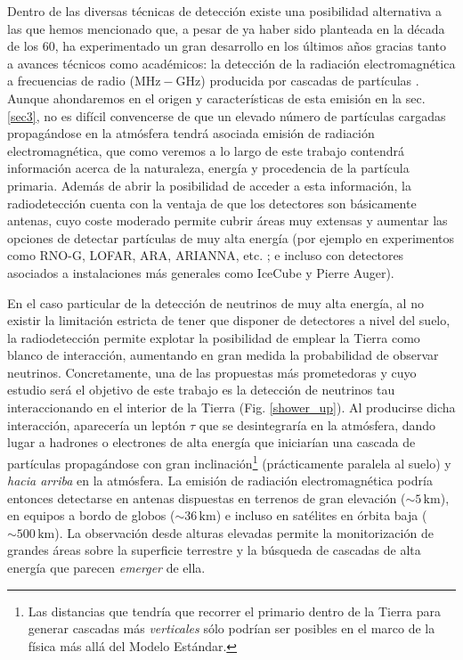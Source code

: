 \documentclass[11 pt, a4paper]{article} %
\numberwithin{equation}{section}
\numberwithin{figure}{section}
\numberwithin{table}{section}
\begin{document}
	Dentro de las diversas técnicas de detección existe una posibilidad alternativa a las que hemos mencionado que, a pesar de ya haber sido planteada en la década de los 60, ha experimentado un gran desarrollo en los últimos años gracias tanto a avances técnicos como académicos: la detección de la radiación electromagnética a frecuencias de radio ($\mathrm{MHz-GHz}$) producida por cascadas de partículas \cite{schroder2017radio}. Aunque ahondaremos en el origen y características de esta emisión en la sec. \ref{sec3}, no es difícil convencerse de que un elevado número de partículas cargadas propagándose en la atmósfera tendrá asociada emisión de radiación electromagnética, que como veremos a lo largo de este trabajo contendrá información acerca de la naturaleza, energía y procedencia de la partícula primaria. Además de abrir la posibilidad de acceder a esta información, la radiodetección cuenta con la ventaja de que los detectores son básicamente antenas, cuyo coste moderado permite cubrir áreas muy extensas y aumentar las opciones de detectar partículas de muy alta energía (por ejemplo en experimentos como RNO-G, LOFAR, ARA, ARIANNA, etc. \cite{schroder2017radio}; e incluso con detectores asociados a instalaciones más generales como IceCube y Pierre Auger).
	
	En el caso particular de la detección de neutrinos de muy alta energía, al no existir la limitación estricta de tener que disponer de detectores a nivel del suelo, la radiodetección permite explotar la posibilidad de emplear la Tierra como blanco de interacción, aumentando en gran medida la probabilidad de observar neutrinos. Concretamente, una de las propuestas más prometedoras y cuyo estudio será el objetivo de este trabajo es la detección de neutrinos tau interaccionando en el interior de la Tierra (Fig. \ref{shower_up}). Al producirse dicha interacción, aparecería un leptón $\tau$ que se desintegraría  en la atmósfera, dando lugar a hadrones o electrones de alta energía que iniciarían una cascada de partículas propagándose con gran inclinación\footnote{ Las distancias que tendría que recorrer el primario dentro de la Tierra para generar cascadas más \textit{verticales} sólo podrían ser posibles en el marco de la física más allá del Modelo Estándar.} (prácticamente paralela al suelo) y \textit{hacia arriba} en la atmósfera. La emisión de radiación electromagnética podría entonces detectarse en antenas dispuestas en terrenos de gran elevación ($\sim 5\,\mathrm{km}$), en equipos a bordo de globos ($\sim 36\,\mathrm{km}$) e incluso en satélites en órbita baja ($\sim 500\,\mathrm{km}$). La observación desde alturas elevadas permite la monitorización de grandes áreas sobre la superficie terrestre y la búsqueda de cascadas de alta energía que parecen \textit{emerger} de ella.
\end{document}
